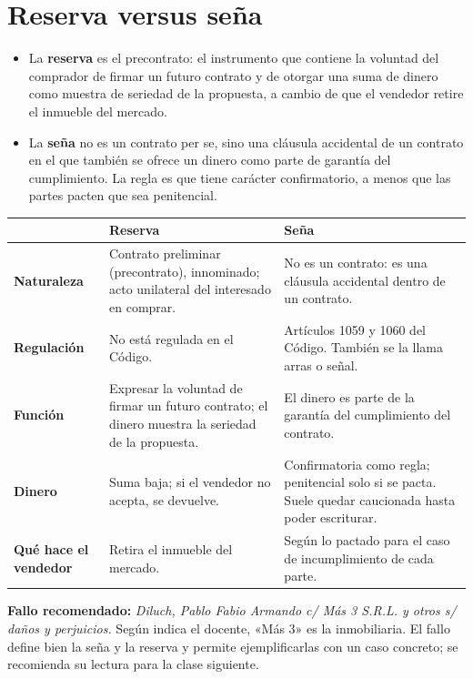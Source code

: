 \documentclass[12pt,oneside]{book}
\begin{document}
\section{Reserva versus seña}

\begin{itemize}
    \item La \textbf{reserva} es el precontrato: el instrumento que contiene la voluntad del comprador de firmar un futuro contrato y de otorgar una suma de dinero como muestra de seriedad de la propuesta, a cambio de que el vendedor retire el inmueble del mercado.
    \item La \textbf{seña} no es un contrato per se, sino una cláusula accidental de un contrato en el que también se ofrece un dinero como parte de garantía del cumplimiento. La regla es que tiene carácter confirmatorio, a menos que las partes pacten que sea penitencial.
\end{itemize}

\begin{table}[H]
\centering
\small
\begin{tabularx}{\textwidth}{@{}>{\raggedright\arraybackslash}p{}>{\raggedright\arraybackslash}X>{\raggedright\arraybackslash}X@{}}
\toprule
 & \textbf{Reserva} & \textbf{Seña} \\
\midrule
\textbf{Naturaleza} & Contrato preliminar (precontrato), innominado; acto unilateral del interesado en comprar. & No es un contrato: es una cláusula accidental dentro de un contrato. \\
\textbf{Regulación} & No está regulada en el Código. & Artículos 1059 y 1060 del Código. También se la llama arras o señal. \\
\textbf{Función} & Expresar la voluntad de firmar un futuro contrato; el dinero muestra la seriedad de la propuesta. & El dinero es parte de la garantía del cumplimiento del contrato. \\
\textbf{Dinero} & Suma baja; si el vendedor no acepta, se devuelve. & Confirmatoria como regla; penitencial solo si se pacta. Suele quedar caucionada hasta poder escriturar. \\
\textbf{Qué hace el vendedor} & Retira el inmueble del mercado. & Según lo pactado para el caso de incumplimiento de cada parte. \\
\bottomrule
\end{tabularx}
\end{table}

\begin{note}
\textbf{Fallo recomendado:} \emph{Diluch, Pablo Fabio Armando c/ Más 3 S.R.L. y otros s/ daños y perjuicios.} Según indica el docente, «Más 3» es la inmobiliaria. El fallo define bien la seña y la reserva y permite ejemplificarlas con un caso concreto; se recomienda su lectura para la clase siguiente.
\end{note}
\end{document}
